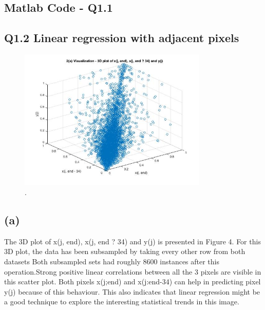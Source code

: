 \documentclass[english]{article}
\begin{document}
\medskip
\subsection*{Matlab Code - Q1.1}


\medskip

\subsection*{Q1.2 Linear regression with adjacent pixels}

\begin{figure}[h!]
  \caption{.}
  \centering
    \includegraphics[width=0.8\textwidth]{fig_1_2_a.jpg}
\end{figure}

\medskip

\subsection*{(a)}
The 3D plot of x(j, end), x(j, end ? 34) and y(j) is presented in Figure 4. For this 3D plot, the data has been subsampled by taking every other row from both datasets Both subsampled sets had roughly 8600 instances after this operation.Strong positive linear correlations between all the 3 pixels are visible in this scatter plot. Both pixels x(j;end) and x(j:end-34) can help in predicting pixel y(j) because of this  behaviour. This also indicates that linear regression might be a good technique to explore  the interesting statistical trends in this image.
\end{document}
